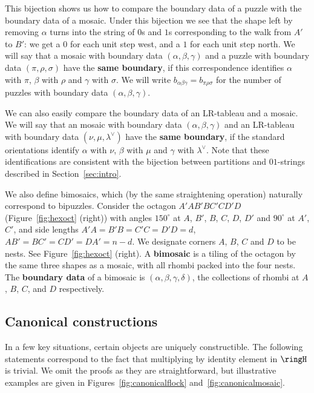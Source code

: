 This bijection shows us how to compare the boundary data of a puzzle
with the boundary data of a mosaic.  Under this bijection we see that
the shape left by removing $\alpha$ turns into the string of $0$s and 
$1$s corresponding to the walk from $A'$ to $B'$: we get a $0$ for
each unit step west, and a $1$ for each unit step north.
We will say that a mosaic with boundary data 
$(\alpha, \beta, \gamma)$ 
and a puzzle with boundary data $(\pi,\rho, \sigma)$ have the 
{\bf same boundary}, if this correspondence identifies $\alpha$ with $\pi$,
$\beta$ with $\rho$ and $\gamma$ with $\sigma$.
We will write $b_{\alpha \beta \gamma} = b_{\pi \rho \sigma}$
for the number of puzzles with boundary data 
$(\alpha, \beta, \gamma)$.

We can also easily compare the boundary data of an LR-tableau and a 
mosaic.  We will say that an mosaic with boundary data 
$(\alpha, \beta, \gamma)$ and an LR-tableau with boundary
data $(\nu, \mu, \lambda^\vee)$ have the {\bf same boundary}, if the 
standard orientations identify $\alpha$ with $\nu$, $\beta$ with $\mu$
and $\gamma$ with $\lambda^\vee$.  Note that these identifications are
consistent with
the bijection between partitions and $01$-strings described in
Section~\ref{sec:intro}.

We also define bimosaics, which (by the same straightening
operation) naturally correspond to bipuzzles.
Consider the octagon $A'AB'BC'CD'D$ (Figure~\ref{fig:hexoct} (right))
with angles $150^\circ$ at $A$, $B'$, $B$, $C$, $D$, $D'$
and $90^\circ$ at $A'$, $C'$, and side lengths
$A'A = B'B = C'C = D'D = d$, $AB' = BC' = CD' = DA' = n-d$.
We designate corners $A$, $B$, $C$ and $D$ to be nests.  See 
Figure~\ref{fig:hexoct} (right).
A {\bf bimosaic} is a tiling of the octagon by the same
three shapes as a mosaic, with all rhombi packed into the four
nests.  The {\bf boundary data} of a bimosaic is
$(\alpha, \beta, \gamma, \delta)$, the collections of rhombi at 
$A$, $B$, $C$, and $D$ respectively.

\subsection{Canonical constructions}
In a few key situations, certain objects are uniquely constructible.  
The following statements correspond to the fact that multiplying
by identity element in $\ringH$ is trivial.
We omit the proofs as they are straightforward, but illustrative
examples are given in Figures~\ref{fig:canonicalflock} 
and~\ref{fig:canonicalmosaic}.

